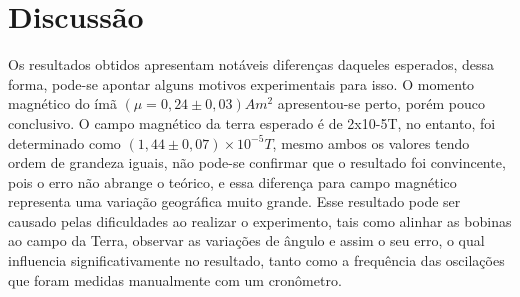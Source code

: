 \section{Discussão}
    Os resultados obtidos apresentam notáveis diferenças daqueles esperados, 
    dessa forma, pode-se apontar alguns motivos experimentais para isso. 
    O momento magnético do ímã $(\mu = 0,24 \pm 0,03) A m^2$ apresentou-se perto, 
    porém pouco conclusivo. O campo magnético da terra esperado é de 2x10-5T, 
    no entanto, foi determinado como $(1,44 \pm 0,07) \times 10^{-5}T$, mesmo ambos os valores 
    tendo ordem de grandeza iguais, não pode-se confirmar que o resultado
    foi convincente, pois o erro não abrange o teórico, e essa diferença para 
    campo magnético representa uma variação geográfica muito grande. 
    Esse resultado pode ser causado pelas dificuldades ao realizar o 
    experimento, tais como alinhar as bobinas ao campo da Terra, observar 
    as variações de ângulo e assim o seu erro, o qual influencia 
    significativamente no resultado, tanto como a frequência das oscilações 
    que foram medidas manualmente com um cronômetro.